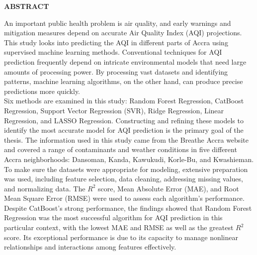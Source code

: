 \documentclass{book}
\numberwithin{equation}{section}
\numberwithin{figure}{section}
\begin{document}
\newpage
{}%
\begin{center}
 \textbf{ABSTRACT}
\end{center}
\begin{doublespacing}
An important public health problem is air quality, and early warnings and mitigation measures depend on accurate Air Quality Index (AQI) projections. This study looks into predicting the AQI in different parts of Accra using supervised machine learning methods. Conventional techniques for AQI prediction frequently depend on intricate environmental models that need large amounts of processing power. By processing vast datasets and identifying patterns, machine learning algorithms, on the other hand, can produce precise predictions more quickly. \\
Six methods are examined in this study: Random Forest Regression, CatBoost Regression, Support Vector Regression (SVR), Ridge Regression, Linear Regression, and LASSO Regression. Constructing and refining these models to identify the most accurate model for AQI prediction is the primary goal of the thesis.
The information used in this study came from the Breathe Accra website and covered a range of contaminants and weather conditions in five different Accra neighborhoods: Dansoman, Kanda, Kawukudi, Korle-Bu, and Kwashieman. To make sure the datasets were appropriate for modeling, extensive preparation was used, including feature selection, data cleaning, addressing missing values, and normalizing data. The $R^2$ score, Mean Absolute Error (MAE), and Root Mean Square Error (RMSE) were used to assess each algorithm's performance.\\ 
Despite CatBoost's strong performance, the findings showed that Random Forest Regression was the most successful algorithm for AQI prediction in this particular context, with the lowest MAE and RMSE as well as the greatest $R^2$ score. Its exceptional performance is due to its capacity to manage nonlinear relationships and interactions among features effectively.
\end{doublespacing}
\end{document}
